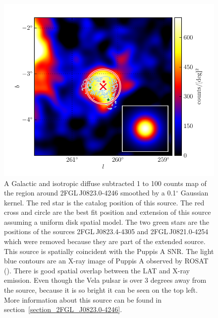 \documentclass[12pt,preprint]{aastex}
\newcommand{\gev}{\text{GeV}\xspace}
\renewcommand{\deg}{\ensuremath{^\circ}\xspace}
\begin{document}
\begin{figure}
  \begin{center}
    \includegraphics[type=pdf,ext=.pdf,read=.pdf]{source_plots/source_1FGL_J0823.3-4248}
  \end{center}
  \caption{A Galactic and isotropic diffuse subtracted 1 \gev to 100
  \gev counts map of the region around 2FGL\,J0823.0-4246 smoothed by a
  0.1\deg Gaussian kernel.  The red star is the catalog position of this source.  
  The red cross and circle are the best fit position
  and extension of this source assuming a uniform disk spatial model.
  The two green stars are the positions of the sources 2FGL\,J0823.4-4305
  and 2FGL\,J0821.0-4254 which were removed because they are part of the
  extended source.  This source is spatially coincident with the Puppis
  A SNR. The light blue contours are an X-ray image of Puppis A observed by
  ROSAT (\cite{rosat_puppis_a}). There is good spatial overlap between
  the LAT and X-ray emission.  Even though the Vela pulsar is over 3
  degrees away from the source, because it is so bright it can be seen
  on the top left.  More information about this source can be found in 
  section~\ref{section_2FGL_J0823.0-4246}.
  }\label{1FGL_J0823.3-4248}
\end{figure}
\end{document}

